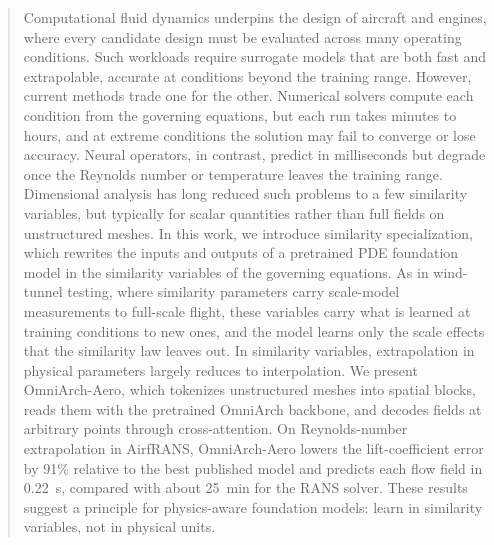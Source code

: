 \documentclass[a4paper,fleqn]{cas-sc}
\begin{document}


\begin{abstract}
Computational fluid dynamics underpins the design of aircraft and engines, where every candidate design must be evaluated across many operating conditions. Such workloads require surrogate models that are both fast and extrapolable, accurate at conditions beyond the training range. However, current methods trade one for the other. Numerical solvers compute each condition from the governing equations, but each run takes minutes to hours, and at extreme conditions the solution may fail to converge or lose accuracy. Neural operators, in contrast, predict in milliseconds but degrade once the Reynolds number or temperature leaves the training range. Dimensional analysis has long reduced such problems to a few similarity variables, but typically for scalar quantities rather than full fields on unstructured meshes. In this work, we introduce similarity specialization, which rewrites the inputs and outputs of a pretrained PDE foundation model in the similarity variables of the governing equations. As in wind-tunnel testing, where similarity parameters carry scale-model measurements to full-scale flight, these variables carry what is learned at training conditions to new ones, and the model learns only the scale effects that the similarity law leaves out. In similarity variables, extrapolation in physical parameters largely reduces to interpolation. We present OmniArch-Aero, which tokenizes unstructured meshes into spatial blocks, reads them with the pretrained OmniArch backbone, and decodes fields at arbitrary points through cross-attention. On Reynolds-number extrapolation in AirfRANS, OmniArch-Aero lowers the lift-coefficient error by 91\% relative to the best published model and predicts each flow field in 0.22~s, compared with about 25~min for the RANS solver. These results suggest a principle for physics-aware foundation models: learn in similarity variables, not in physical units.
\end{abstract}
\end{document}
